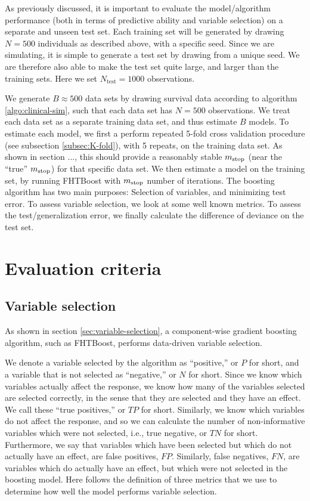 As previously discussed, it is important to evaluate the model/algorithm performance (both in terms of predictive ability and variable selection) on a separate and unseen test set.
Each training set will be generated by drawing $N=500$ individuals as described above, with a specific seed.
Since we are simulating, it is simple to generate a test set by drawing from a unique seed.
We are therefore also able to make the test set quite large, and larger than the training sets.
Here we set $N_{\text{test}}=1000$ observations.

We generate $B\approx500$ data sets by drawing survival data according to algorithm \ref{algo:clinical-sim}, such that each data set has $N=500$ observations. 
We treat each data set as a separate training data set, and thus estimate $B$ models.
To estimate each model, we first a perform repeated 5-fold cross validation procedure (see subsection \ref{subsec:K-fold}), with 5 repeats, on the training data set.
As shown in section ..., this should provide a reasonably stable $m_{\text{stop}}$ (near the ``true'' $m_{\text{stop}}$) for that specific data set.
We then estimate a model on the training set, by running FHTBoost with $m_{\text{stop}}$ number of iterations.
The boosting algorithm has two main purposes: Selection of variables, and minimizing test error.
To assess variable selection, we look at some well known metrics.
To assess the test/generalization error, we finally calculate the difference of deviance on the test set.

\section{Evaluation criteria}
\subsection{Variable selection}
As shown in section \ref{sec:variable-selection}, a component-wise gradient boosting algorithm, such as FHTBoost,
performs data-driven variable selection.

We denote a variable selected by the algorithm as ``positive,'' or $P$ for short, and a variable that is not selected as ``negative,'' or $N$ for short.
Since we know which variables actually affect the response, we know how many of the variables selected are selected correctly, in the sense
that they are selected and they have an effect. We call these ``true positives,'' or $TP$ for short.
Similarly, we know which variables do not affect the response, and so we can calculate the number of non-informative variables
which were not selected, i.e., true negative, or $TN$ for short.
Furthermore, we say that variables which have been selected but which do not actually have an effect, are false positives, $FP$.
Similarly, false negatives, $FN$, are variables which do actually have an effect, but which were not selected in the boosting model.
Here follows the definition of three metrics that we use to determine how well the model performs variable selection.

